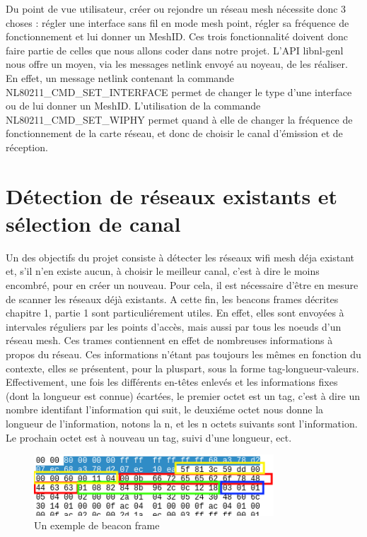 Du point de vue utilisateur, créer ou rejondre  un réseau mesh nécessite donc 3 choses : régler une interface sans fil en mode mesh
point, régler sa fréquence de fonctionnement et lui donner un MeshID. Ces trois fonctionnalité doivent donc faire partie de celles que
nous allons coder dans notre projet. L'API libnl-genl nous offre un moyen, via les messages netlink envoyé au noyeau, de les réaliser.
En effet, un message netlink contenant la commande NL80211\_\-CMD\_\-SET\_\-INTERFACE permet de changer le type d'une interface ou de lui 
donner un MeshID. L'utilisation de la commande NL80211\_\-CMD\_\-SET\_\-WIPHY permet quand à elle de changer la fréquence de fonctionnement
de la carte réseau, et donc de choisir le canal d'émission et de réception.

\section{Détection de réseaux existants et sélection de canal}

Un des objectifs du projet consiste à détecter les réseaux wifi mesh déja existant et, s'il n'en existe aucun, à choisir le
meilleur canal, c'est à dire le moins encombré, pour en créer un nouveau. Pour cela, il est nécessaire d'être en mesure de scanner
les réseaux déjà existants. A cette fin, les beacons frames décrites chapitre 1, partie 1 sont particuliérement utiles. En effet,
elles sont envoyées à intervales réguliers par les points d'accès, mais aussi par tous les noeuds d'un réseau mesh. Ces trames 
contiennent en effet de nombreuses informations à propos du réseau. Ces informations n'étant pas toujours les mêmes en fonction du 
contexte, elles se présentent, pour la pluspart, sous la forme tag-longueur-valeurs. Effectivement, une fois les différents en-têtes 
enlevés et les informations fixes (dont la longueur est connue) écartées, le premier octet est un tag, c'est à dire un nombre 
identifant l'information qui suit, le deuxiéme octet nous donne la longueur de l'information, notons la n, et les n octets suivants
sont l'information. Le prochain octet est à nouveau un tag, suivi d'une longueur, ect.

\begin{figure}
   \centering
   \includegraphics[width=0.8\textwidth,natwidth=610,natheight=642]{images/beacon_frame.png}
   \caption{Un exemple de beacon frame}
\end{figure}

